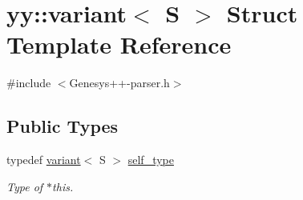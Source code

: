 \hypertarget{structyy_1_1variant}{\section{yy\-:\-:variant$<$ S $>$ Struct Template Reference}
\label{structyy_1_1variant}
}


{\ttfamily \#include $<$Genesys++-\/parser.\-h$>$}

\subsection*{Public Types}
\begin{DoxyCompactItemize}
\item 
typedef \hyperlink{structyy_1_1variant}{variant}$<$ S $>$ \hyperlink{structyy_1_1variant_afbd75aee339bd9fa06e6fa8f320cecd3}{self\-\_\-type}
\begin{DoxyCompactList}\small\item\em Type of $\ast$this. \end{DoxyCompactList}\end{DoxyCompactItemize}

